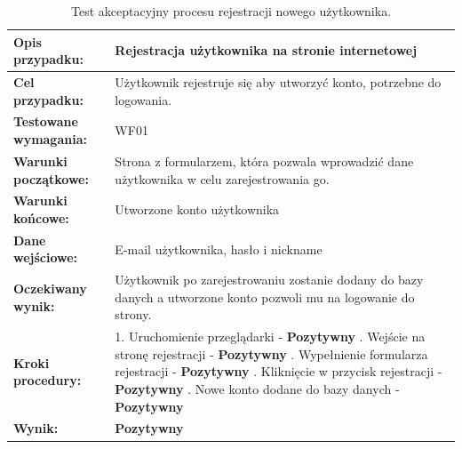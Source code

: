 \begin{table}[H]
\centering
\begin{tabularx}{\textwidth}{|>{\raggedright\arraybackslash}p{}|X|}
    \hline
    \textbf{Opis przypadku:} & Rejestracja użytkownika na stronie internetowej \\
    \hline
    \textbf{Cel przypadku:} & Użytkownik rejestruje się aby utworzyć konto, potrzebne do logowania. \\
    \hline
    \textbf{Testowane wymagania:} & WF01 \\
    \hline
    \textbf{Warunki początkowe:} & Strona z formularzem, która pozwala wprowadzić dane użytkownika w celu zarejestrowania go. \\
    \hline
    \textbf{Warunki końcowe:} & Utworzone konto użytkownika \\
    \hline
    \textbf{Dane wejściowe:} & E-mail użytkownika, hasło i nickname \\
    \hline
    \textbf{Oczekiwany wynik:} & Użytkownik po zarejestrowaniu zostanie dodany do bazy danych a utworzone konto pozwoli mu na logowanie do strony. \\
    \hline
    \textbf{Kroki procedury:} &
        1. Uruchomienie przeglądarki - \textbf{Pozytywny} \newline
        2. Wejście na stronę rejestracji - \textbf{Pozytywny} \newline
        3. Wypełnienie formularza rejestracji - \textbf{Pozytywny} \newline
        4. Kliknięcie w przycisk rejestracji - \textbf{Pozytywny} \newline
        5. Nowe konto dodane do bazy danych - \textbf{Pozytywny} \\
    \hline
    \textbf{Wynik:} & \textbf{Pozytywny} \\
    \hline
\end{tabularx}
    \caption{Test akceptacyjny procesu rejestracji nowego użytkownika.}
\end{table}



